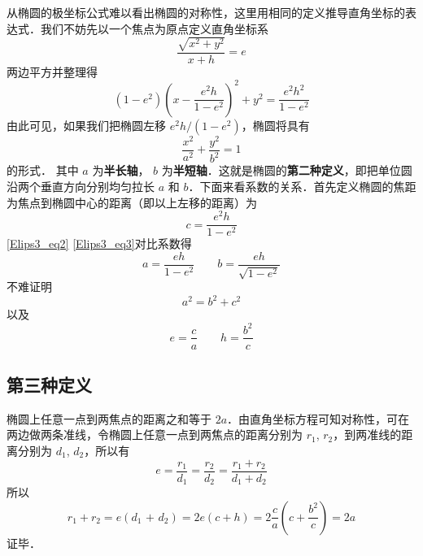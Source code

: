 
从椭圆的极坐标公式难以看出椭圆的对称性，这里用相同的定义推导直角坐标的表达式．我们不妨先以一个焦点为原点定义直角坐标系
\begin{equation}
\frac{{\sqrt {{x^2} + {y^2}} }}{{x + h}} = e
\end{equation}
两边平方并整理得
\begin{equation}\label{Elips3_eq2}
(1 - {e^2}){\left( {x - \frac{{{e^2}h}}{{1 - {e^2}}}} \right)^2} + {y^2} = \frac{{{e^2}{h^2}}}{{1 - {e^2}}}
\end{equation}
由此可见，如果我们把椭圆左移 ${e^2}h/(1 - {e^2})$，椭圆将具有
\begin{equation}\label{Elips3_eq3}
\frac{{{x^2}}}{{{a^2}}} + \frac{{{y^2}}}{{{b^2}}} = 1
\end{equation}
的形式． 其中 $a$ 为\textbf{半长轴}， $b$ 为\textbf{半短轴}．这就是椭圆的\textbf{第二种定义}，即把单位圆沿两个垂直方向分别均匀拉长 $a$ 和 $b$．下面来看系数的关系．首先定义椭圆的焦距为焦点到椭圆中心的距离（即以上左移的距离）为
\begin{equation}
c = \frac{{{e^2}h}}{{1 - {e^2}}}
\end{equation}
\autoref{Elips3_eq2} \autoref{Elips3_eq3}对比系数得
\begin{equation}
a = \frac{{eh}}{{1 - {e^2}}} \qquad b = \frac{{eh}}{{\sqrt {1 - {e^2}} }}
\end{equation}
不难证明
\begin{equation}
{a^2} = {b^2} + {c^2}
\end{equation}
以及
\begin{equation}
e = \frac{c}{a} \qquad h = \frac{{{b^2}}}{c}
\end{equation}

\subsection{第三种定义}
椭圆上任意一点到两焦点的距离之和等于 $2a$．由直角坐标方程可知对称性，可在两边做两条准线，令椭圆上任意一点到两焦点的距离分别为 $r_1$, $r_2$，到两准线的距离分别为 $d_1$, $d_2$，所以有
\begin{equation}
e = \frac{{{r_1}}}{{{d_1}}} = \frac{{{r_2}}}{{{d_2}}} = \frac{{{r_1} + {r_2}}}{{{d_1} + {d_2}}}
\end{equation}
所以
\begin{equation}
{r_1} + {r_2} = e({d_1}{\text{ + }}{d_2}) = 2e(c + h) = 2\frac{c}{a}\left( {c + \frac{{{b^2}}}{c}} \right) = 2a
\end{equation}
证毕．
